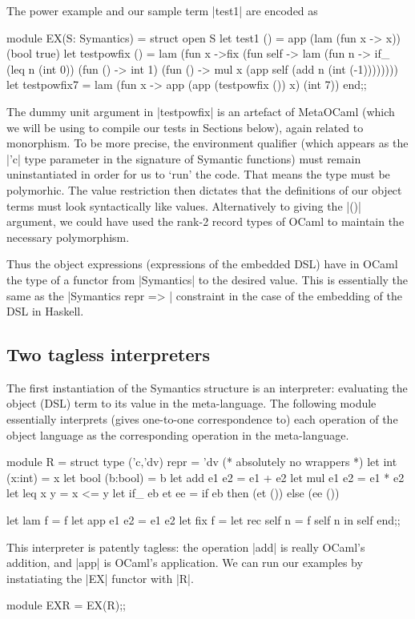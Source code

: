 \documentclass[preprint]{sigplanconf}
\begin{document}
The power example and our sample term |test1| are encoded as
\begin{code}
module EX(S: Symantics) = struct
 open S
 let test1 () = app (lam (fun x -> x)) (bool true)
 let testpowfix () = 
   lam (fun x ->fix (fun self -> lam (fun n ->
     if_ (leq n (int 0)) (fun () -> int 1)
         (fun () -> mul x (app self 
                               (add n (int (-1))))))))
 let testpowfix7 = 
    lam (fun x -> app (app (testpowfix ()) x) (int 7))
end;;
\end{code}
The dummy unit argument in |testpowfix| is an artefact of MetaOCaml
(which we will be using to compile our tests in Sections below),
again related to monorphism. To be
more precise, the environment qualifier (which appears as the |'c|
type parameter in the signature of Symantic functions) must remain
uninstantiated in order for us to `run' the code. That means the type
must be polymorhic. The value restriction then dictates that
the definitions of our object terms must look syntactically like
values. Alternatively to giving the |()| argument, we could have used
the rank-2 record types of OCaml to maintain the necessary polymorphism.

Thus the object expressions (expressions of the embedded DSL) have in
OCaml the type of a functor from |Symantics| to the desired value. This
is essentially the same as the |Symantics repr => | constraint in the case of
the embedding of the DSL in Haskell.

\subsection{Two tagless interpreters}
The first instantiation of the Symantics structure is an interpreter:
evaluating the object (DSL) term to its value in the meta-language. 
The following module essentially interprets (gives one-to-one
correspondence to) each operation of the object language as the
corresponding operation in the meta-language.
\begin{code}
module R  = struct
  type ('c,'dv) repr = 'dv (* absolutely no wrappers *)
  let int  (x:int)  = x
  let bool (b:bool) = b
  let add  e1 e2    = e1 + e2
  let mul  e1 e2    = e1 * e2
  let leq  x y      = x <= y
  let if_  eb et ee = if eb then (et ()) else (ee ())

  let lam f         = f
  let app e1 e2     = e1 e2
  let fix f         = let rec self n = f self n in self
end;;
\end{code}

This interpreter is patently tagless: the operation |add| is really
OCaml's addition, and |app| is OCaml's application. We can run our
examples by instatiating the |EX| functor with |R|.
\noindent
\begin{code}
  module EXR = EX(R);;
\end{code}
\end{document}
